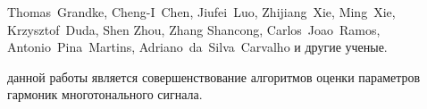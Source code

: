 Thomas~Grandke,
Cheng-I~Chen,
Jiufei~Luo, Zhijiang~Xie, Ming~Xie,
Krzysztof~Duda,
Shen Zhou, Zhang Shancong,
Carlos~Joao~Ramos, Antonio~Pina~Martins, Adriano~da~Silva~Carvalho и другие ученые.

{\aim} данной работы является совершенствование алгоритмов оценки параметров гармоник многотонального сигнала.



